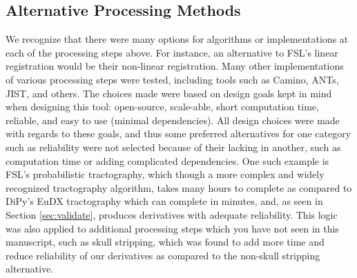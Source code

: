 \subsection{Alternative Processing Methods}
\label{sec:altproc}
We recognize that there were many options for algorithms or implementations at each of the processing steps above. For instance, an alternative to FSL's linear registration would be their non-linear registration. Many other implementations of various processing steps were tested, including tools such as Camino, ANTs, JIST, and others. The choices made were based on design goals kept in mind when designing this tool: open-source, scale-able, short computation time, reliable, and easy to use (minimal dependencies). All design choices were made with regards to these goals, and thus some preferred alternatives for one category such as reliability were not selected because of their lacking in another, such as computation time or adding complicated dependencies. One such example is FSL's probabilistic tractography, which though a more complex and widely recognized tractography algorithm, takes many hours to complete as compared to DiPy's EuDX tractography which can complete in minutes, and, as seen in Section \ref{sec:validate}, produces derivatives with adequate reliability. This logic was also applied to additional processing steps which you have not seen in this manuscript, such as skull stripping, which was found to add more time and reduce reliability of our derivatives as compared to the non-skull stripping alternative.

